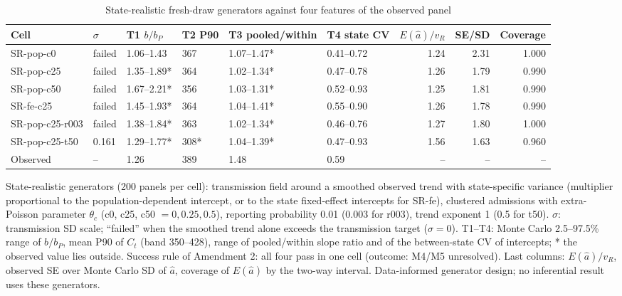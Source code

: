 \begin{table}[!tbp]
\centering
\scriptsize\renewcommand{\arraystretch}{1.15}
\setlength{\tabcolsep}{3pt}
\caption{State-realistic fresh-draw generators against four features of the observed panel}
\label{tab:r2-generator}
\begin{tabularx}{\linewidth}{@{}Xlllllrrr@{}}
\toprule
Cell & $\sigma$ & T1 $b/b_P$ & T2 P90 & T3 pooled/within & T4 state CV & $E(\hat a)/v_R$ & SE/SD & Coverage \\
\midrule
SR-pop-c0 & failed & 1.06--1.43 & 367 & 1.07--1.47* & 0.41--0.72 & 1.24 & 2.31 & 1.000 \\
SR-pop-c25 & failed & 1.35--1.89* & 364 & 1.02--1.34* & 0.47--0.78 & 1.26 & 1.79 & 0.990 \\
SR-pop-c50 & failed & 1.67--2.21* & 356 & 1.03--1.31* & 0.52--0.93 & 1.25 & 1.81 & 0.990 \\
SR-fe-c25 & failed & 1.45--1.93* & 364 & 1.04--1.41* & 0.55--0.90 & 1.26 & 1.78 & 0.990 \\
SR-pop-c25-r003 & failed & 1.38--1.84* & 363 & 1.02--1.34* & 0.46--0.76 & 1.27 & 1.80 & 1.000 \\
SR-pop-c25-t50 & 0.161 & 1.29--1.77* & 308* & 1.04--1.39* & 0.47--0.93 & 1.56 & 1.63 & 0.960 \\
Observed & -- & 1.26 & 389 & 1.48 & 0.59 & -- & -- & -- \\
\bottomrule
\end{tabularx}
\par\smallskip\parbox{\linewidth}{\scriptsize\linespread{1.15}\selectfont State-realistic generators (200 panels per cell): transmission field around a smoothed observed trend with state-specific variance (multiplier proportional to the population-dependent intercept, or to the state fixed-effect intercepts for SR-fe), clustered admissions with extra-Poisson parameter $\theta_c$ (c0, c25, c50 $=0, 0.25, 0.5$), reporting probability 0.01 (0.003 for r003), trend exponent 1 (0.5 for t50). $\sigma$: transmission SD scale; ``failed'' when the smoothed trend alone exceeds the transmission target ($\sigma=0$). T1--T4: Monte Carlo 2.5--97.5\% range of $b/b_P$, mean P90 of $C_t$ (band 350--428), range of pooled/within slope ratio and of the between-state CV of intercepts; * the observed value lies outside. Success rule of Amendment 2: all four pass in one cell (outcome: M4/M5 unresolved). Last columns: $E(\hat a)/v_R$, observed SE over Monte Carlo SD of $\hat a$, coverage of $E(\hat a)$ by the two-way interval. Data-informed generator design; no inferential result uses these generators.}
\end{table}
